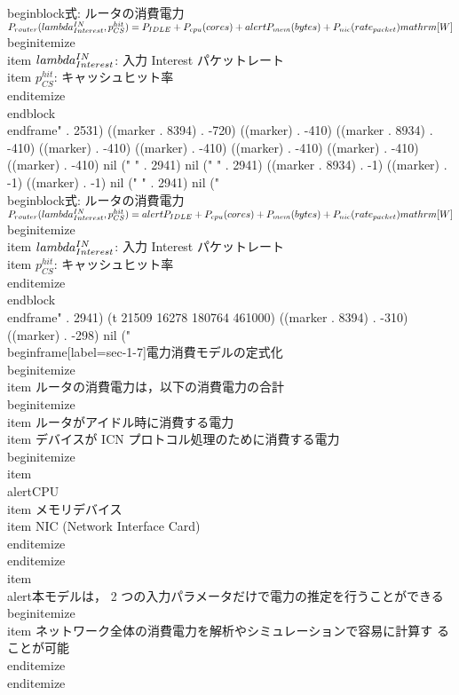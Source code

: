 {\\begin{block}{式: ルータの消費電力}%
$P_{router}(\\lambda^{IN}_{Interest}, p^{hit}_{CS}) = P_{IDLE} +
P_{cpu}(cores) + \\alert{P_{mem}(bytes)} + P_{nic}(rate_{packet}) \\mathrm{[W]}$
\\begin{itemize}
\\item $\\lambda^{IN}_{Interest}$: 入力 Interest パケットレート
\\item $p^{hit}_{CS}$: キャッシュヒット率
\\end{itemize}
\\end{block}
\\end{frame}" . 2531) ((marker . 8394) . -720) ((marker) . -410) ((marker . 8934) . -410) ((marker) . -410) ((marker) . -410) ((marker) . -410) ((marker) . -410) ((marker) . -410) nil ("
" . 2941) nil ("
" . 2941) ((marker . 8934) . -1) ((marker) . -1) ((marker) . -1) nil ("
" . 2941) nil ("\\begin{block}{式: ルータの消費電力}%
$P_{router}(\\lambda^{IN}_{Interest}, p^{hit}_{CS}) = \\alert{P_{IDLE}} +
P_{cpu}(cores) + P_{mem}(bytes) + P_{nic}(rate_{packet}) \\mathrm{[W]}$
\\begin{itemize}
\\item $\\lambda^{IN}_{Interest}$: 入力 Interest パケットレート
\\item $p^{hit}_{CS}$: キャッシュヒット率
\\end{itemize}
\\end{block}
\\end{frame}" . 2941) (t 21509 16278 180764 461000) ((marker . 8394) . -310) ((marker) . -298) nil ("\\begin{frame}[label=sec-1-7]{電力消費モデルの定式化}
\\begin{itemize}
\\item ルータの消費電力は，以下の消費電力の合計
\\begin{itemize}
\\item ルータがアイドル時に消費する電力
\\item デバイスが ICN プロトコル処理のために消費する電力
\\begin{itemize}
\\item \\alert{CPU}
\\item メモリデバイス
\\item NIC (Network Interface Card)
\\end{itemize}
\\end{itemize}
\\item \\alert{本モデルは， 2 つの入力パラメータだけで電力の推定を行うことができる}
\\begin{itemize}
\\item ネットワーク全体の消費電力を解析やシミュレーションで容易に計算す
ることが可能
\\end{itemize}
\\end{itemize}

}
